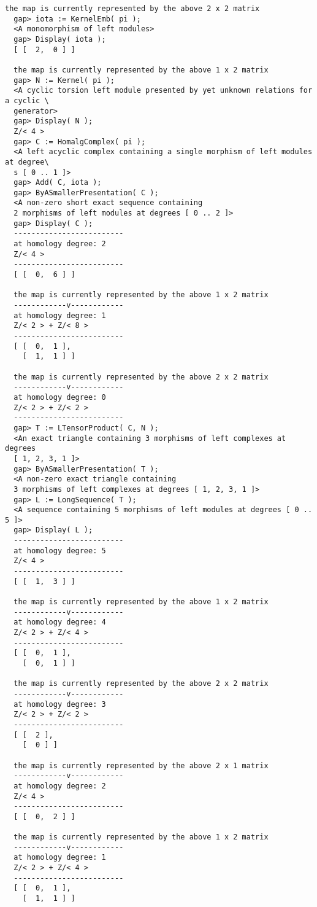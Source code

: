 \documentclass[a4paper,11pt]{report}
\begin{document}
{{{\begin{Verbatim}[fontsize=\small,frame=single,label=Example]
  the map is currently represented by the above 2 x 2 matrix
  gap> iota := KernelEmb( pi );
  <A monomorphism of left modules>
  gap> Display( iota );
  [ [  2,  0 ] ]
  
  the map is currently represented by the above 1 x 2 matrix
  gap> N := Kernel( pi );
  <A cyclic torsion left module presented by yet unknown relations for a cyclic \
  generator>
  gap> Display( N );
  Z/< 4 >
  gap> C := HomalgComplex( pi );
  <A left acyclic complex containing a single morphism of left modules at degree\
  s [ 0 .. 1 ]>
  gap> Add( C, iota );
  gap> ByASmallerPresentation( C );
  <A non-zero short exact sequence containing
  2 morphisms of left modules at degrees [ 0 .. 2 ]>
  gap> Display( C );
  -------------------------
  at homology degree: 2
  Z/< 4 >
  -------------------------
  [ [  0,  6 ] ]
  
  the map is currently represented by the above 1 x 2 matrix
  ------------v------------
  at homology degree: 1
  Z/< 2 > + Z/< 8 >
  -------------------------
  [ [  0,  1 ],
    [  1,  1 ] ]
  
  the map is currently represented by the above 2 x 2 matrix
  ------------v------------
  at homology degree: 0
  Z/< 2 > + Z/< 2 >
  -------------------------
  gap> T := LTensorProduct( C, N );
  <An exact triangle containing 3 morphisms of left complexes at degrees
  [ 1, 2, 3, 1 ]>
  gap> ByASmallerPresentation( T );
  <A non-zero exact triangle containing
  3 morphisms of left complexes at degrees [ 1, 2, 3, 1 ]>
  gap> L := LongSequence( T );
  <A sequence containing 5 morphisms of left modules at degrees [ 0 .. 5 ]>
  gap> Display( L );
  -------------------------
  at homology degree: 5
  Z/< 4 >
  -------------------------
  [ [  1,  3 ] ]
  
  the map is currently represented by the above 1 x 2 matrix
  ------------v------------
  at homology degree: 4
  Z/< 2 > + Z/< 4 >
  -------------------------
  [ [  0,  1 ],
    [  0,  1 ] ]
  
  the map is currently represented by the above 2 x 2 matrix
  ------------v------------
  at homology degree: 3
  Z/< 2 > + Z/< 2 >
  -------------------------
  [ [  2 ],
    [  0 ] ]
  
  the map is currently represented by the above 2 x 1 matrix
  ------------v------------
  at homology degree: 2
  Z/< 4 >
  -------------------------
  [ [  0,  2 ] ]
  
  the map is currently represented by the above 1 x 2 matrix
  ------------v------------
  at homology degree: 1
  Z/< 2 > + Z/< 4 >
  -------------------------
  [ [  0,  1 ],
    [  1,  1 ] ]
  

\end{Verbatim}}}}
\end{document}
